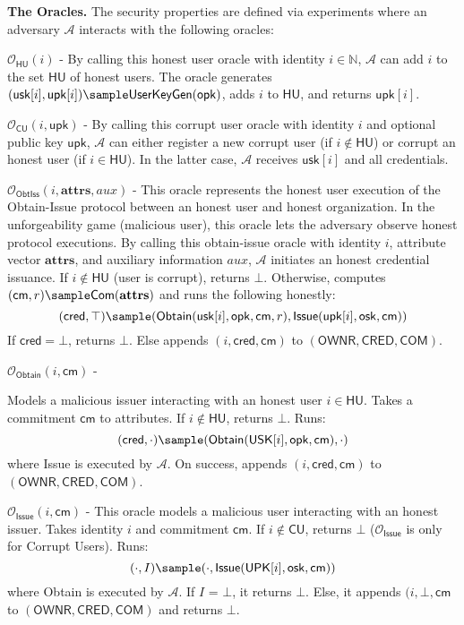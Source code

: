 \noindent  \textbf{The Oracles.} The security properties are defined via experiments where an adversary $\mathcal{A}$ interacts with the following oracles:

\noindent $\mathcal{O}_{\mathsf{HU}}(i)$ - By calling this honest user oracle with identity $i \in \mathbb{N}$, $\mathcal{A}$ can add $i$ to the set $\mathsf{HU}$ of honest users. The oracle generates $(\mathsf{usk}[i], \mathsf{upk}[i]) \sample \mathsf{UserKeyGen}(\mathsf{opk})$, adds $i$ to $\mathsf{HU}$, and returns $\mathsf{upk}[i]$.

\noindent $\mathcal{O}_{\mathsf{CU}}(i, \mathsf{upk})$ - By calling this corrupt user oracle with identity $i$ and optional public key $\mathsf{upk}$, $\mathcal{A}$ can either register a new corrupt user (if $i \notin \mathsf{HU}$) or corrupt an honest user (if $i \in \mathsf{HU}$). In the latter case, $\mathcal{A}$ receives $\mathsf{usk}[i]$ and all credentials.

\noindent $\mathcal{O}_{\mathsf{ObtIss}}(i, \mathbf{attrs}, aux)$ - This oracle represents the honest user execution of the Obtain-Issue protocol between an honest user and honest organization. In the unforgeability game (malicious user), this oracle lets the adversary observe honest protocol executions. 
By calling this obtain-issue oracle with identity $i$, attribute vector $\mathbf{attrs}$, and auxiliary information $aux$, $\mathcal{A}$ initiates an honest credential issuance. If $i \notin \mathsf{HU}$ (user is corrupt), returns $\bot$. Otherwise, computes $(\mathsf{cm}, r) \sample \mathsf{Com}(\mathbf{attrs})$ and runs the following honestly:
\[
(\mathsf{cred}, \top) \sample (\mathsf{Obtain}(\mathsf{usk}[i], \mathsf{opk}, \mathsf{cm}, r), \mathsf{Issue}(\mathsf{upk}[i], \mathsf{osk}, \mathsf{cm}))
\]
If $\mathsf{cred} = \bot$, returns $\bot$. Else appends $(i, \mathsf{cred}, \mathsf{cm})$ to $(\mathsf{OWNR}, \mathsf{CRED}, \mathsf{COM})$.

\noindent  $\mathcal{O}_{\mathsf{Obtain}}(i, \mathsf{cm})$ - 


Models a malicious issuer interacting with an honest user $i \in \mathsf{HU}$. Takes a commitment $\mathsf{cm}$ to attributes. If $i \notin \mathsf{HU}$, returns $\bot$. Runs:
\[
(\mathsf{cred}, \cdot) \sample (\mathsf{Obtain}(\mathsf{USK}[i], \mathsf{opk}, \mathsf{cm}), \cdot)
\]
where Issue is executed by $\mathcal{A}$. On success, appends $(i, \mathsf{cred}, \mathsf{cm})$ to $(\mathsf{OWNR}, \mathsf{CRED}, \mathsf{COM})$.

\noindent  $\mathcal{O}_{\mathsf{Issue}}(i, \mathsf{cm})$ - This oracle models a malicious user interacting with an honest issuer. Takes identity $i$ and commitment $\mathsf{cm}$. If $i \notin \mathsf{CU}$, returns $\bot$ ($\mathcal{O}_{\mathsf{Issue}}$ is only for Corrupt Users). Runs:
\[
(\cdot, I) \sample (\cdot, \mathsf{Issue}(\mathsf{UPK}[i], \mathsf{osk}, \mathsf{cm}))
\]
where Obtain is executed by $\mathcal{A}$. If $I$ = $\bot$, it returns $\bot$. Else, it appends $(i, \bot, \mathsf{cm}$ to $(\mathsf{OWNR}, \mathsf{CRED}, \mathsf{COM})$ and returns $\bot$.


